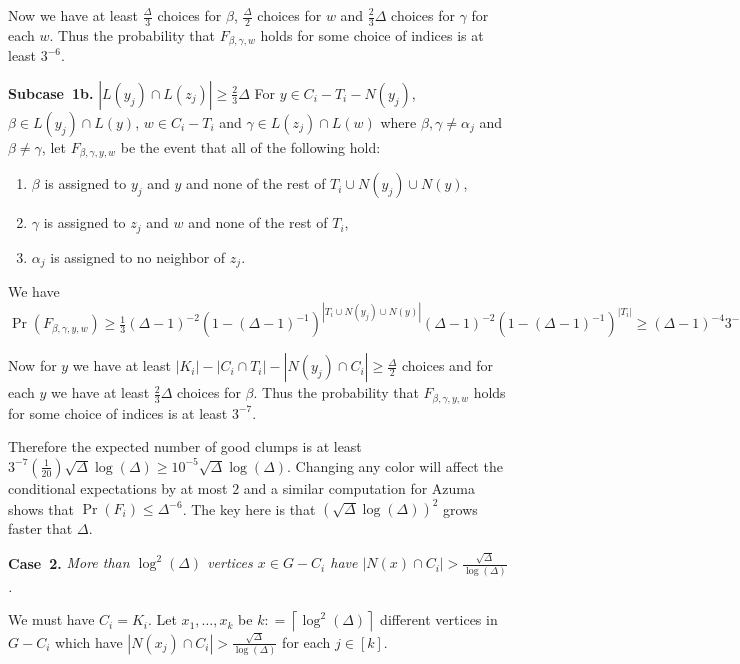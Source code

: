 \documentclass[12pt]{article}
\theoremstyle{plain}
\theoremstyle{definition}
\theoremstyle{remark}
\newcommand{\card}[1]{\left|#1\right|}
\newcommand{\ceil}[1]{\left\lceil#1\right\rceil}
\newcommand{\irange}[1]{\left[#1\right]}
\newcommand{\DefinedAs}{\mathrel{\mathop:}=}
\begin{document}
Now we have at least $\frac{\Delta}{3}$ choices for $\beta$, $\frac{\Delta}{2}$
choices for $w$ and $\frac 23 \Delta$ choices for $\gamma$ for each $w$.  Thus
the probability that $F_{\beta, \gamma, w}$ holds for some choice of indices is
at least $3^{-6}$.

\textbf{Subcase~1b.} \textit{$\card{L(y_j) \cap L(z_j)} \geq \frac23 \Delta$}
For $y \in C_i - T_i - N(y_j)$, $\beta \in L(y_j) \cap L(y)$, $w \in C_i - T_i$
and $\gamma \in L(z_j) \cap L(w)$ where $\beta, \gamma \neq \alpha_j$ and $\beta \neq \gamma$, let
$F_{\beta, \gamma, y, w}$ be the event that all of the following hold:

\begin{enumerate}
  \item $\beta$ is assigned to $y_j$ and $y$ and none of the rest of $T_i \cup
  N(y_j) \cup N(y)$,
  \item $\gamma$ is assigned to $z_j$ and $w$ and none of the rest of $T_i$,
  \item $\alpha_j$ is assigned to no neighbor of $z_j$.
\end{enumerate}

We have $\Pr(F_{\beta, \gamma, y, w}) \geq
\frac13 (\Delta-1)^{-2}(1-(\Delta-1)^{-1})^{\card{T_i \cup
N(y_j) \cup N(y)}}(\Delta-1)^{-2}(1 - (\Delta-1)^{-1})^{\card{T_i}} \geq
(\Delta-1)^{-4}3^{-5}.$

Now for $y$ we have at least $\card{K_i} - \card{C_i \cap T_i} - \card{N(y_j)
\cap C_i} \geq \frac{\Delta}{2}$ choices and for each $y$ we have at least
$\frac23 \Delta$ choices for $\beta$. Thus the probability that $F_{\beta,
\gamma, y, w}$ holds for some choice of indices is at least $3^{-7}$.

\bigskip

Therefore the expected number of good clumps is at least $3^{-7}
(\frac{1}{20})\sqrt{\Delta}\log(\Delta) \geq 10^{-5} \sqrt{\Delta}\log(\Delta)$.   
Changing any color will affect the conditional expectations by at most $2$ and a
similar computation for Azuma shows that $\Pr(F_i) \leq \Delta^{-6}$.  The key
here is that $(\sqrt{\Delta}\log(\Delta))^2$ grows faster that $\Delta$.

\textbf{Case~2.} \textit{More than $\log^2(\Delta)$ vertices $x \in G  - C_i$ have
$\card{N(x) \cap C_i} > \frac{\sqrt{\Delta}}{\log(\Delta)}$.}

We must have $C_i = K_i$.  Let $x_1, \ldots, x_k$ be $k \DefinedAs
\ceil{\log^2(\Delta)}$ different vertices in $G - C_i$ which have $\card{N(x_j)
\cap C_i} > \frac{\sqrt{\Delta}}{\log(\Delta)}$ for each $j \in \irange{k}$.  
\end{document}
